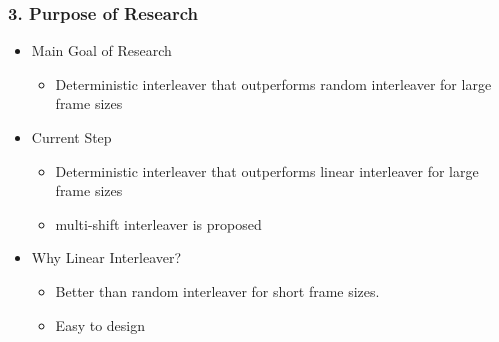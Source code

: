 \documentclass{beamer}  %
\begin{document}
\begin{frame}
\frametitle{3. Purpose of Research}
\begin{itemize}
\setlength\itemsep{2em}

\item Main Goal of Research 

\begin{itemize}
\item Deterministic interleaver that outperforms random interleaver for large frame sizes
\end{itemize}

\item Current Step

\begin{itemize}
\item Deterministic interleaver that outperforms linear interleaver for large frame sizes

\item multi-shift interleaver is proposed
\end{itemize}

\item Why Linear Interleaver?
\begin{itemize}
\item Better than random interleaver for short frame sizes.

\item Easy to design
\end{itemize}

\end{itemize}
\end{frame}
\end{document}
